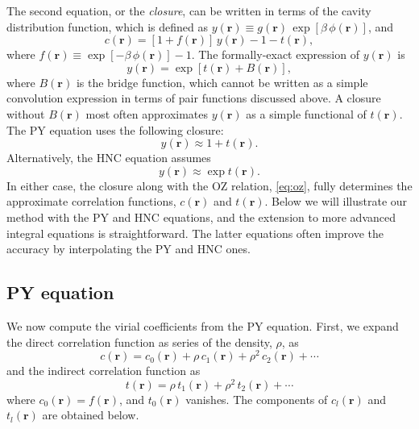 \documentclass[aip,jcp,preprint,superscriptaddress,showpacs,preprintnumbers,amsmath,amssymb]{revtex4-1}
\newcommand{\vct}[1]{\mathbf{#1}}
\providecommand{\vr}{} %
\renewcommand{\vr}{\vct{r}}
\begin{document}
The second equation, or the \emph{closure},
can be written in terms of the cavity distribution function,
which is defined as $y(\vr) \equiv g(\vr) \, \exp[\beta \, \phi(\vr)]$,
and
%
%
%
\begin{equation}
c(\vr)
=
[1 + f(\vr)] \, y(\vr) - 1 - t(\vr),
\label{eq:closure_cr_yr}
\end{equation}
%
%
%
where $f(\vr) \equiv \exp[-\beta \, \phi(\vr)] - 1$.
%
The formally-exact expression of $y(\vr)$ is
%
%
%
\[
y(\vr)
=
\exp[
t(\vr) + B(\vr)
],
\]
%
%
%
where $B(\vr)$
is the bridge function,
which cannot be written as a simple convolution expression
in terms of pair functions discussed above\cite{hansen}.
%
A closure without $B(\vr)$ most often
approximates $y(\vr)$ as a simple functional of $t(\vr)$.
%
The PY equation uses the following closure\cite{percusyevick}:
%
%
%
\begin{equation}
y(\vr) \approx 1 + t(\vr).
\label{eq:py}
\end{equation}
%
%
%
Alternatively,
the HNC equation assumes\cite{
morita1958, *morita1959, morita1960,
vanleeuwen1959,
*meeron1960, *verlet1960, *green1960,
*rushbrooke1960}
%
%
%
\begin{equation}
y(\vr)
\approx
\exp t(\vr).
\label{eq:hnc}
\end{equation}
%
%
%
In either case,
the closure along with the OZ relation, \eqref{eq:oz},
fully determines the approximate correlation functions,
$c(\vr)$ and $t(\vr)$.
%
Below we will illustrate our method
with the PY and HNC equations,
and the extension to more advanced integral equations\cite{
hiroike1957, *lee1995,
hurst1965,
rowlinson1965,
rowlinson1966,
lado1967, *henderson1970, *zerah1986,
caligaris1968, *zhou1990, *attard1991, *henderson1996,
gaskell1968,
stell1969, *rosenfeld1979,
hutchinson1971,
hutchinson1972,
verlet1980,
hall1980,
martynov1983,
rogers1984,
ballone1986,
duh1995, *bomont2001, *choudhury2002,
marucho2007}
is straightforward.
%
The latter equations often improve
the accuracy by interpolating the PY and HNC ones.





\subsection{\label{sec:PY}
PY equation}





We now compute the virial coefficients
from the PY equation\cite{percusyevick}.
%
First,
we expand the direct correlation function
as series of the density, $\rho$, as
%
\begin{equation}
c(\vr)
=
c_0(\vr)
+ \rho \, c_1(\vr)
+ \rho^2 \, c_2(\vr)
+ \cdots
\label{eq:crser}
\end{equation}
%
and the indirect correlation function as
%
\begin{equation}
t(\vr)
=
\rho \, t_1(\vr)
+ \rho^2 \, t_2(\vr)
+ \cdots
\label{eq:trser}
\end{equation}
%
where $c_0(\vr) = f(\vr)$,
and $t_0(\vr)$ vanishes.
%
The components of $c_l(\vr)$ and $t_l(\vr)$
are obtained below.
\end{document}
